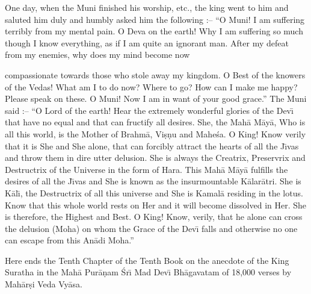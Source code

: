 One day, when the Muni finished his worship, etc., the king went to him and saluted him duly and humbly asked him the following :-- ``O Muni! I am suffering terribly from my mental pain. O Deva on the earth! Why I am suffering so much though I know everything, as if I am quite an ignorant man. After my defeat from my enemies, why does my mind become now

compassionate towards those who stole away my kingdom. O Best of the knowers of the Vedas! What am I to do now? Where to go? How can I make me happy? Please speak on these. O Muni! Now I am in want of your good grace.'' The Muni said :-- ``O Lord of the earth! Hear the extremely wonderful glories of the Dev\={\i} that have no equal and that can fructify all desires. She, the Mah\=a M\=ay\=a, Who is all this world, is the Mother of Brahm\=a, Vi\d{s}\d{n}u and Mahe\'sa. O King! Know verily that it is She and She alone, that can forcibly attract the hearts of all the J\={\i}vas and throw them in dire utter delusion. She is always the Creatrix, Preservrix and Destructrix of the Universe in the form of Hara. This Mah\=a M\=ay\=a fulfills the desires of all the J\={\i}vas and She is known as the insurmountable K\=alar\=atri. She is K\=al\={\i}, the Destructrix of all this universe and She is Kamal\=a residing in the lotus. Know that this whole world rests on Her and it will become dissolved in Her. She is therefore, the Highest and Best. O King! Know, verily, that he alone can cross the delusion (Moha) on whom the Grace of the Dev\={\i} falls and otherwise no one can escape from this An\=adi Moha.''

Here ends the Tenth Chapter of the Tenth Book on the anecdote of the King Suratha in the Mah\=a Pur\=a\d{n}am \'Sr\={\i} Mad Dev\={\i} Bh\=agavatam of 18,000 verses by Mah\=ar\d{s}i Veda Vy\=asa.




